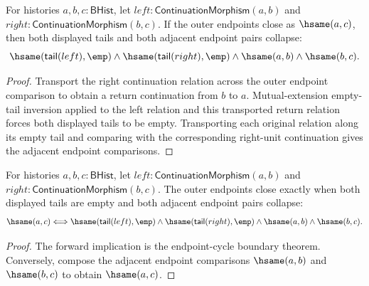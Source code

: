 \begin{theorem}
\label{thm:continuation-morphism-comp-endpoint-cycle-boundary}
For histories $a,b,c:\mathsf{BHist}$, let
$left:\mathsf{ContinuationMorphism}(a,b)$ and
$right:\mathsf{ContinuationMorphism}(b,c)$. If the outer endpoints close as
$\hsame(a,c)$, then both displayed tails and both adjacent endpoint pairs
collapse:
$$
\hsame(\mathsf{tail}(left),\emp)\land
\hsame(\mathsf{tail}(right),\emp)\land
\hsame(a,b)\land\hsame(b,c).
$$
\end{theorem}
\begin{proof}
Transport the right continuation relation across the outer endpoint comparison
to obtain a return continuation from $b$ to $a$. Mutual-extension empty-tail
inversion applied to the left relation and this transported return relation
forces both displayed tails to be empty. Transporting each original relation
along its empty tail and comparing with the corresponding right-unit
continuation gives the adjacent endpoint comparisons.
\end{proof}

\begin{theorem}
\label{thm:continuation-morphism-comp-endpoint-cycle-boundary-iff}
For histories $a,b,c:\mathsf{BHist}$, let
$left:\mathsf{ContinuationMorphism}(a,b)$ and
$right:\mathsf{ContinuationMorphism}(b,c)$. The outer endpoints close exactly
when both displayed tails are empty and both adjacent endpoint pairs collapse:
$$
\hsame(a,c)\Longleftrightarrow
\hsame(\mathsf{tail}(left),\emp)\land
\hsame(\mathsf{tail}(right),\emp)\land
\hsame(a,b)\land\hsame(b,c).
$$
\end{theorem}
\begin{proof}
The forward implication is the endpoint-cycle boundary theorem. Conversely,
compose the adjacent endpoint comparisons $\hsame(a,b)$ and $\hsame(b,c)$ to
obtain $\hsame(a,c)$.
\end{proof}

